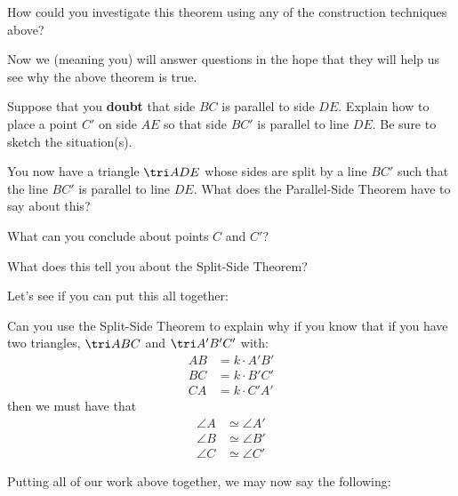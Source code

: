 \begin{question} 
How could you investigate this theorem using any of the construction
techniques above?
\end{question}
\QM

Now we (meaning you) will answer questions in the hope that they will
help us see why the above theorem is true.

\begin{question}
Suppose that you \textbf{doubt} that side $BC$ is parallel to side $DE$. Explain
how to place a point $C'$ on side $AE$ so that side $BC'$ is
parallel to line $DE$. Be sure to sketch the situation(s).
\end{question}
\QM

\begin{question} 
You now have a triangle $\tri ADE$ whose sides are split by a line
$BC'$ such that the line $BC'$ is parallel to line $DE$. What does the
Parallel-Side Theorem have to say about this?
\end{question}
\QM

\begin{question} What can you conclude about points $C$ and $C'$?
\end{question}
\QM


\begin{question} 
What does this tell you about the Split-Side Theorem?
\end{question}
\QM




Let's see if you can put this all together:
\begin{question}
Can you use the Split-Side Theorem to explain why if you know that
if you have two triangles, $\tri ABC$ and $\tri A'B'C'$ with:
\begin{align*}
AB &= k\cdot A'B'\\
BC &= k\cdot B'C'\\
CA &= k\cdot C'A'
\end{align*}
then we must have that
\begin{align*}
\angle A &\simeq \angle A'\\
\angle B &\simeq \angle B' \\
\angle C &\simeq \angle C'
\end{align*}
\end{question}
\QM

Putting all of our work above together, we may now say the following:





